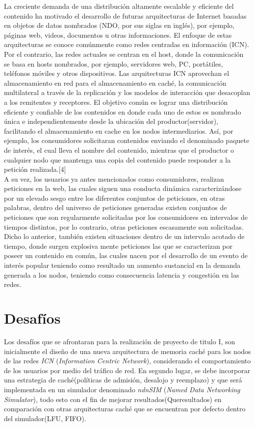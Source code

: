 \documentclass[12pt]{ociamthesis}  %
\begin{document}
La creciente demanda de una distribución altamente escalable y eficiente del contenido ha motivado el desarrollo de futuras arquitecturas de Internet basadas en objetos de datos nombrados (NDO, por sus siglas en inglés), por ejemplo, páginas web, videos, documentos u otras informaciones. El enfoque de estas arquitecturas se conoce comúnmente como redes centradas en información (ICN). Por el contrario, las redes actuales se centran en el host, donde la comunicación se basa en hosts nombrados, por ejemplo, servidores web, PC, portátiles, teléfonos móviles y otros dispositivos. Las arquitecturas ICN aprovechan el almacenamiento en red para el almacenamiento en caché, la comunicación multilateral a través de la replicación y los modelos de interacción que desacoplan a los remitentes y receptores. El objetivo común es lograr una distribución eficiente y confiable de los contenidos en donde cada uno de estos es nombrado única e independientemente desde la ubicación del productor(servidor), facilitando el almacenamiento en cache en los nodos intermediarios. Así, por ejemplo, los consumidores solicitaran contenidos enviando el denominado paquete de interés, el cual lleva el nombre del contenido, mientras que el productor o cualquier nodo que mantenga una copia del contenido puede responder a la petición realizada.[4]\\

A su vez, los usuarios ya antes mencionados como consumidores, realizan peticiones en la web, las cuales siguen una conducta dinámica caracterizándose por un elevado sesgo entre los diferentes conjuntos de peticiones, en otras palabras, dentro del universo de peticiones generadas existen conjuntos de peticiones que son regularmente solicitadas por los consumidores en intervalos de tiempos distintos, por lo contrario, otras peticiones escasamente son solicitadas. Dicho lo anterior, también existen situaciones dentro de un intervalo acotado de tiempo, donde surgen explosiva mente peticiones las que se caracterizan por poseer un contenido en común, las cuales nacen por el desarrollo de un evento de interés popular teniendo como resultado un aumento sustancial en la demanda generada a los nodos, teniendo como consecuencia latencia y congestión en las redes.


\section{Desafíos}
Los desafíos que se afrontaran para la realización de proyecto de titulo I, son inicialmente el diseño de una nueva arquitectura de memoria caché para los nodos de las redes \textit{ICN} (\textit{Information Centric Network}), considerando el comportamiento de los usuarios por medio del tráfico de red. En segundo lugar, se debe incorporar una estrategia de caché(políticas de admisión, desalojo y reemplazo) y que será implementada en un simulador denominado \textit{ndnSIM} (\textit{Named Data Networking Simulator}), todo esto con el fin de mejorar resultados(Queresultados) en comparación con otras arquitecturas caché que se encuentran por defecto dentro del simulador(LFU, FIFO).\\
\end{document}
